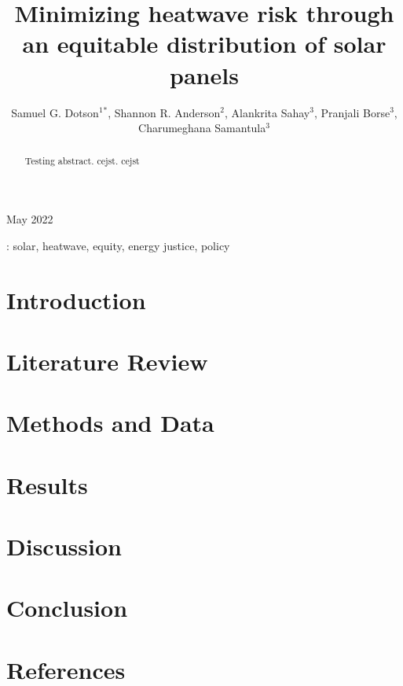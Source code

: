 \documentclass[10pt]{iopart}
\begin{document}
\title[Minimizing heatwave risk through an equitable distribution of solar panels]{Minimizing
heatwave risk through an equitable distribution of solar panels}

 \author{
 Samuel G. Dotson$^1$$^*$,
 Shannon R. Anderson$^2$,
 Alankrita Sahay$^3$,
 Pranjali Borse$^3$,
 Charumeghana Samantula$^3$
 }

 \address{ $^1$ Department of Nuclear, Plasma, and Radiological Engineering,
 University of Illinois Urbana-Champaign, Urbana IL, United States}
  \address{ $^2$ Department of  Natural Resources and Environmental Sciences,
 University of Illinois Urbana-Champaign, Urbana IL, United States}
  \address{ $^3$ Department of Civil and Environmental Engineering,
 University of Illinois Urbana-Champaign, Urbana IL, United States}
 \address{$^*$ Author to whom correspondence should be addressed}


 \begin{indented}
 \vspace{10pt}
 \item[]May 2022
 \end{indented}

 \begin{abstract}
 Testing abstract. \ac{cejst}. \ac{cejst}
 \end{abstract}

 \vspace{2pc}
: solar, heatwave, equity, energy justice, policy

\ioptwocol
\acresetall

\section{Introduction}


\section{Literature Review}


\section{Methods and Data}
\label{section:methods_data}


\section{Results}
\label{section:results}

\section{Discussion}
\label{section:discussion}


\section{Conclusion}

% 
\section*{References}



 
\end{document}
